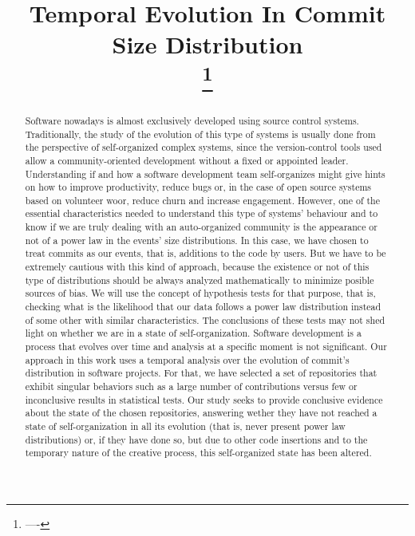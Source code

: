 \documentclass[conference]{IEEEtran}
\begin{document}
\title{Temporal Evolution In Commit Size Distribution\\
  \thanks{----} }

\author{\IEEEauthorblockN{-} \IEEEauthorblockA{-} \and
  \IEEEauthorblockN{-} \IEEEauthorblockA{-} }

\maketitle

\begin{abstract}
  Software nowadays is almost exclusively developed using source
  control systems. Traditionally, the study of the evolution of this
  type of systems is usually done from the perspective of
  self-organized complex systems, since the version-control tools used
  allow a community-oriented development without a fixed or appointed
  leader. Understanding if and how a software development team
  self-organizes might give hints on how to improve productivity,
  reduce bugs or, in the case of open source systems based on
  volunteer woor, reduce churn and increase engagement.
  However, one of the essential characteristics needed to understand
  this type of systems' behaviour and to know if we are truly dealing
  with an auto-organized community is the appearance or not of a power
  law in the events' size distributions.  In this case, we have chosen
  to treat commits as our events, that is, additions to the code by
  users.
  But we have to be extremely cautious with this kind of approach,
  because the existence or not of this type of distributions should be
  always analyzed mathematically to minimize posible sources of bias.
  We will use the concept of hypothesis tests for that purpose, that
  is, checking what is the likelihood that our data follows a power
  law distribution instead of some other with similar characteristics.
  The conclusions of these tests may not shed light on whether we are
  in a state of self-organization.  Software development is a process
  that evolves over time and analysis at a specific moment is not
  significant.  Our approach in this work uses a temporal analysis
  over the evolution of commit's distribution in software
  projects. For that, we have selected a set of repositories that
  exhibit singular behaviors such as a large number of contributions
  versus few or inconclusive results in statistical tests.
  Our study seeks to provide conclusive evidence about the state of
  the chosen repositories, answering wether they have not reached a
  state of self-organization in all its evolution (that is, never
  present power law distributions) or, if they have done so, but due
  to other code insertions and to the temporary nature of the creative
  process, this self-organized state has been altered.


\end{abstract}
\end{document}
